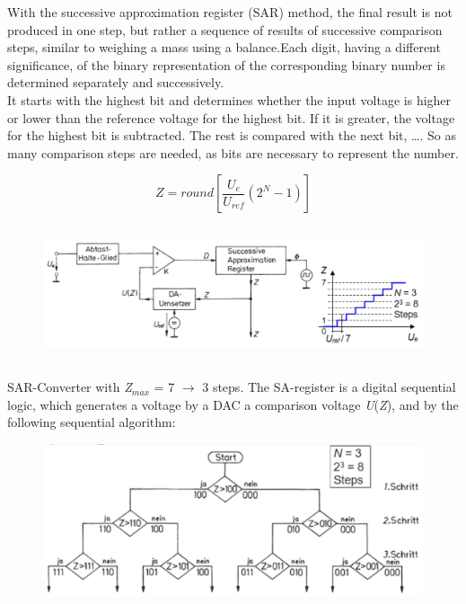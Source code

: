 With the successive approximation register (SAR) method, the final result is not produced in one step, but rather a sequence of results of successive comparison steps, similar to weighing a mass using a balance.Each digit, having a different significance, of the binary representation of the corresponding binary number is determined separately and successively.\\

It starts with the highest bit and determines whether the input voltage is higher or lower than the reference voltage for the highest bit. If it is greater, the voltage for the highest bit is subtracted. The rest is compared with the next bit, {\dots}. So as many comparison steps are needed, as bits are necessary to represent the number.

\[Z=round\left[\frac{U_{e} }{U_{ref} } \left(2^{N} -1\right)\right]\] 
    \begin{figure}[h]
    \centering
    \includegraphics[width=13cm, height=4cm]{Images/image176.png}
    \label{fig:Fig 130}
    \end{figure}

SAR-Converter with \textit{Z${}_{max}$} = 7 $\rightarrow$  3 steps. The SA-register is a digital sequential logic, which generates a voltage by a DAC a comparison voltage \textit{U}(\textit{Z}), and by the following sequential algorithm:

    \begin{figure}[h]
    \centering
    \includegraphics[width=12cm, height=4.5cm]{Images/image177.png}
    \label{fig:Fig 131}
    \end{figure}


